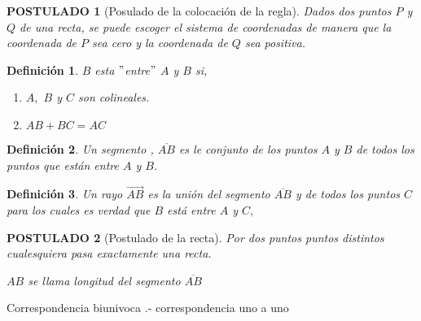 \documentclass[10pt]{book}
\newtheorem{def.}{\textbf{Definición}}[chapter]%
\newtheorem{post}{\textbf{POSTULADO}}[part]%
\begin{document}
\begin{tcolorbox}
\begin{post}[Posulado de la colocación de la regla]
Dados dos puntos $P$ y $Q$ de una recta, se puede escoger el sistema de coordenadas de manera que la coordenada de $P$ sea cero y la coordenada de $Q$ sea positiva.\\
\end{post}
\begin{def.} $B$ esta $"$entre$"$ $A$ y $B$ si,
\begin{enumerate}[\bfseries i)]
\item $A,$ $B$ y $C$ son colineales.
\item $AB + BC = AC$\\
\end{enumerate}
\end{def.}
\begin{def.}
Un segmento , $\overline{AB}$ es le conjunto de los puntos $A$ y $B$ de todos los puntos que están entre $A$ y $B$.\\
\end{def.}
\begin{def.}
Un rayo $\overrightarrow{AB}$ es la unión del segmento $\overline{AB}$ y de todos los puntos $C$ para los cuales es verdad que $B$ está entre $A$ y $C,$
\begin{center}
\end{center}
\end{def.}
\end{tcolorbox}

\begin{tcolorbox}
\begin{post}[Postulado de la recta]
Por dos puntos puntos distintos cualesquiera pasa exactamente una recta.
\begin{center}
$AB$ se llama longitud del segmento $\overline{AB}$\\
\end{center}
\end{post}
Correspondencia biunivoca .- correspondencia uno a uno
\end{tcolorbox}
\end{document}
